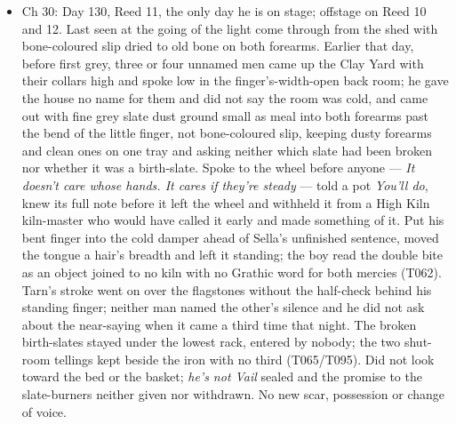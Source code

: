 \documentclass{design/chronicle}
\begin{document}
{\begin{itemize}[leftmargin=1.4em,itemsep=1pt,topsep=3pt,parsep=0pt]
\end{itemize}

\begin{itemize}[leftmargin=1.4em,itemsep=1pt,topsep=3pt,parsep=0pt]

\item Ch 30: Day 130, Reed 11, the only day he is on stage; offstage on Reed 10 and 12. Last seen at the going of the light come through from the shed with bone-coloured slip dried to old bone on both forearms. Earlier that day, before first grey, three or four unnamed men came up the Clay Yard with their collars high and spoke low in the finger’s-width-open back room; he gave the house no name for them and did not say the room was cold, and came out with fine grey slate dust ground small as meal into both forearms past the bend of the little finger, not bone-coloured slip, keeping dusty forearms and clean ones on one tray and asking neither which slate had been broken nor whether it was a birth-slate. Spoke to the wheel before anyone — \emph{It doesn’t care whose hands. It cares if they’re steady} — told a pot \emph{You’ll do}, knew its full note before it left the wheel and withheld it from a High Kiln kiln-master who would have called it early and made something of it. Put his bent finger into the cold damper ahead of Sella’s unfinished sentence, moved the tongue a hair’s breadth and left it standing; the boy read the double bite as an object joined to no kiln with no Grathic word for both mercies (T062). Tarn’s stroke went on over the flagstones without the half-check behind his standing finger; neither man named the other’s silence and he did not ask about the near-saying when it came a third time that night. The broken birth-slates stayed under the lowest rack, entered by nobody; the two shut-room tellings kept beside the iron with no third (T065/T095). Did not look toward the bed or the basket; \emph{he’s not Vail} sealed and the promise to the slate-burners neither given nor withdrawn. No new scar, possession or change of voice.

\end{itemize}

\begin{itemize}[leftmargin=1.4em,itemsep=1pt,topsep=3pt,parsep=0pt]


\end{itemize}}
\end{document}
